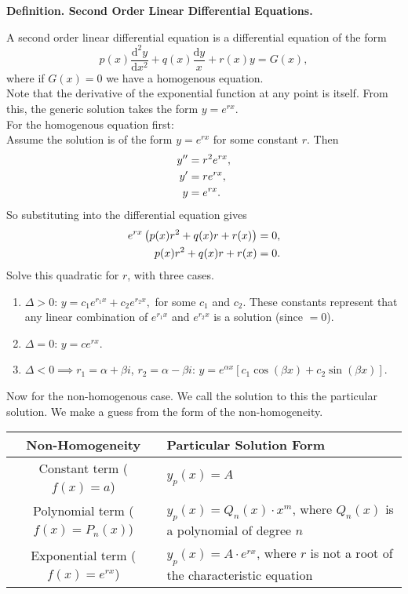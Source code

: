 \documentclass{article}
\newcommand{\definition}[2]{\textbf{Definition. #1.}\begin{adjustwidth}{1cm}{1cm}#2\end{adjustwidth}}
\begin{document}
\definition{Second Order Linear Differential Equations}{A second order linear differential equation is a differential equation of the form \[p(x)\frac{\mathrm{d}^2y}{\mathrm{d}x^2} + q(x) \frac{\mathrm{d}y}{x} + r(x)y = G(x),\]where if $G(x) = 0$ we have a homogenous equation.\\[1\baselineskip]Note that the derivative of the exponential function at any point is itself. From this, the generic solution takes the form $y = e^{rx}$.\\[1\baselineskip]For the homogenous equation first:\\Assume the solution is of the form $y = e^{rx}$ for some constant $r$. Then \begin{align}y'' &= r^2e^{rx}, \notag \\ y' &= re^{rx}, \notag \\ y &= e^{rx}. \notag\end{align} So substituting into the differential equation gives \begin{align}e^{rx}\left( p(x)r^2 + q(x)r + r(x) \right)&= 0, \notag \\ p(x)r^2 + q(x)r + r(x) &= 0. \notag\end{align}Solve this quadratic for $r$, with three cases.\begin{enumerate} \item $\Delta > 0$: $y = c_1 e^{r_1x} + c_2 e^{r_2x},$ for some $c_1$ and $c_2$. These constants represent that any linear combination of $e^{r_1x}$ and $e^{r_2x}$ is a solution (since $= 0$).\item $\Delta = 0$: $y = ce^{rx}$.\item $\Delta < 0 \implies r_1 = \alpha + \beta i$, $r_2 = \alpha - \beta i$: $y = e^{\alpha x}[c_1 \cos (\beta x) + c_2 \sin (\beta x)]$. \end{enumerate}Now for the non-homogenous case. We call the solution to this the particular solution. We make a guess from the form of the non-homogeneity.\begin{table}[htbp]
    \begin{tabularx}{\textwidth}{|c|X|}
      \hline
      Non-Homogeneity & Particular Solution Form \\
      \hline
      Constant term ($f(x) = a$) & $y_p(x) = A$ \\
      \hline
      Polynomial term ($f(x) = P_n(x)$) & $y_p(x) = Q_n(x) \cdot x^m$, where $Q_n(x)$ is a polynomial of degree $n$ \\
      \hline
      Exponential term ($f(x) = e^{rx}$) & $y_p(x) = A \cdot e^{rx}$, where $r$ is not a root of the characteristic equation \\

\end{tabularx}
\end{table}}
\end{document}
